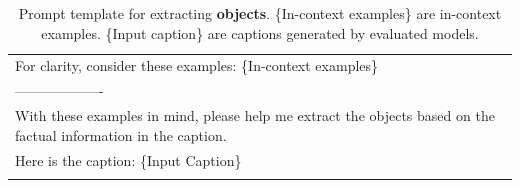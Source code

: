 \begin{table}[h!]
\begin{minipage}{0.95\textwidth}
\begin{tcolorbox}
\begin{tabular}{p{}}
    For clarity, consider these examples: \textcolor[rgb]{0,0.7,0}{ \{In-context examples\} } \\
------------------- \\
    With these examples in mind, please help me extract the objects based on the factual information in the caption. \\
    Here is the caption: 
\textcolor[rgb]{0.8,0,0}{\{Input Caption\}} \\
\\

    \end{tabular}
\end{tcolorbox}
\caption{Prompt template for extracting \textbf{objects}. \textcolor[rgb]{0,0.7,0}{ \{In-context examples\} } are in-context examples. \textcolor[rgb]{0.8,0,0}{\{Input caption\}} are captions generated by evaluated models.}
    \label{tab:extraction_obj}
\end{minipage}
\end{table}

